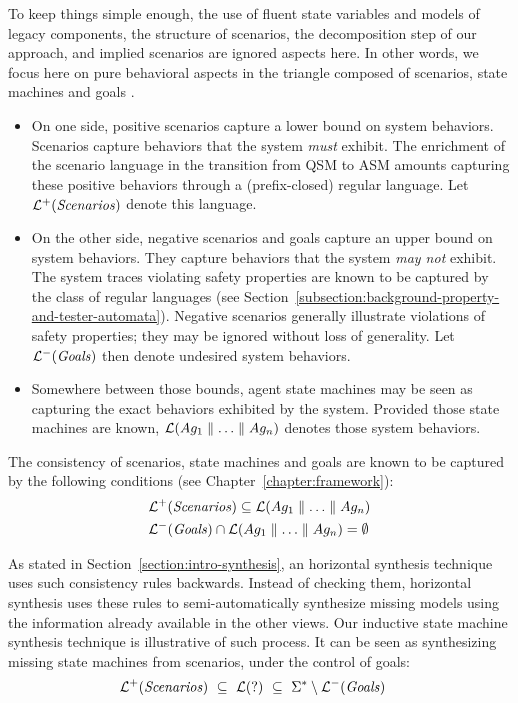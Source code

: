 To keep things simple enough, the use of fluent state variables and models of legacy components, the structure of scenarios, the decomposition step of our approach, and implied scenarios are ignored aspects here. In other words, we focus here on pure behavioral aspects in the triangle composed of scenarios, state machines and goals \cite{Damas:2006, Uchitel:2007}.
\begin{itemize}
\item On one side, positive scenarios capture a lower bound on system behaviors. Scenarios capture behaviors that the system \emph{must} exhibit. The enrichment of the scenario language in the transition from QSM to ASM amounts capturing these positive behaviors through a (prefix-closed) regular language. Let $\mathcal{L}^+(\mbox{\emph{Scenarios}})$ denote this language. 
\item On the other side, negative scenarios and goals capture an upper bound on system behaviors. They capture behaviors that the system \emph{may not} exhibit. The system traces violating safety properties are known to be captured by the class of regular languages (see Section~\ref{subsection:background-property-and-tester-automata}). Negative scenarios generally illustrate violations of safety properties; they may be ignored without loss of generality. Let $\mathcal{L}^-(\mbox{\emph{Goals}})$ then denote undesired system behaviors.
\item Somewhere between those bounds, agent state machines may be seen as capturing the exact behaviors exhibited by the system. Provided those state machines are known, $\mathcal{L}(Ag_1 \parallel \ldots \parallel Ag_n)$ denotes those system behaviors. 
\end{itemize}

The consistency of scenarios, state machines and goals are known to be captured by the following conditions (see Chapter~\ref{chapter:framework}):
\begin{align*}
&\mathcal{L}^+(\mbox{\emph{Scenarios}}) \subseteq \mathcal{L}(Ag_1 \parallel \ldots \parallel Ag_n) \\
&\mathcal{L}^-(\mbox{\emph{Goals}}) \cap \mathcal{L}(Ag_1 \parallel \ldots \parallel Ag_n) = \emptyset
\end{align*}

As stated in Section~\ref{section:intro-synthesis}, an horizontal synthesis technique uses such consistency rules backwards. Instead of checking them, horizontal synthesis uses these rules to semi-automatically synthesize missing models using the information already available in the other views. Our inductive state machine synthesis technique is illustrative of such process. It can be seen as synthesizing missing state machines from scenarios, under the control of goals:
\begin{align*}
&\mathcal{L}^+(\mbox{\emph{Scenarios}})~\subseteq~\mathcal{L}(?)~\subseteq~\Sigma^* \setminus \mathcal{L}^-(\mbox{\emph{Goals}})
\end{align*}

